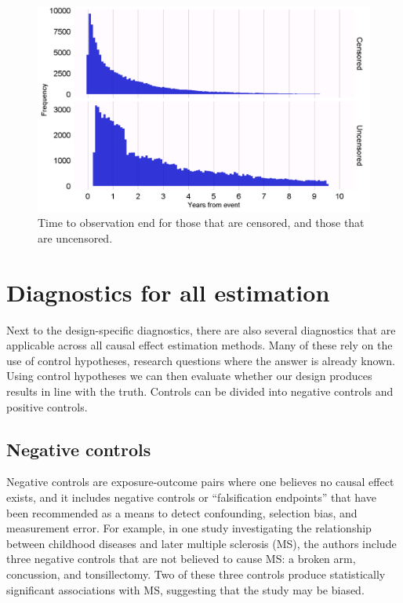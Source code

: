 \documentclass[11pt]{book}
\theoremstyle{definition}
\theoremstyle{definition}
\theoremstyle{definition}
\theoremstyle{remark}
\begin{document}
\begin{figure}

{\centering \includegraphics[width=1\linewidth]{images/MethodValidity/timeToObsEnd} 

}

\caption{Time to observation end for those that are censored, and those that are uncensored.}\label{fig:timeToObsEnd}
\end{figure}

\hypertarget{diagnostics-for-all-estimation}{%
\section{Diagnostics for all estimation}\label{diagnostics-for-all-estimation}}

Next to the design-specific diagnostics, there are also several diagnostics that are applicable across all causal effect estimation methods. Many of these rely on the use of control hypotheses, research questions where the answer is already known. Using control hypotheses we can then evaluate whether our design produces results in line with the truth. Controls can be divided into negative controls and positive controls.

\hypertarget{NegativeControls}{%
\subsection{Negative controls}\label{NegativeControls}}

Negative controls are exposure-outcome pairs where one believes no causal effect exists, and it includes negative controls or ``falsification endpoints'' \citep{prased_2013} that have been recommended as a means to detect confounding, \citep{lipsitch_2010} selection bias, and measurement error. \citep{arnold_2016} For example, in one study \citep{zaadstra_2008} investigating the relationship between childhood diseases and later multiple sclerosis (MS), the authors include three negative controls that are not believed to cause MS: a broken arm, concussion, and tonsillectomy. Two of these three controls produce statistically significant associations with MS, suggesting that the study may be biased.
\end{document}
